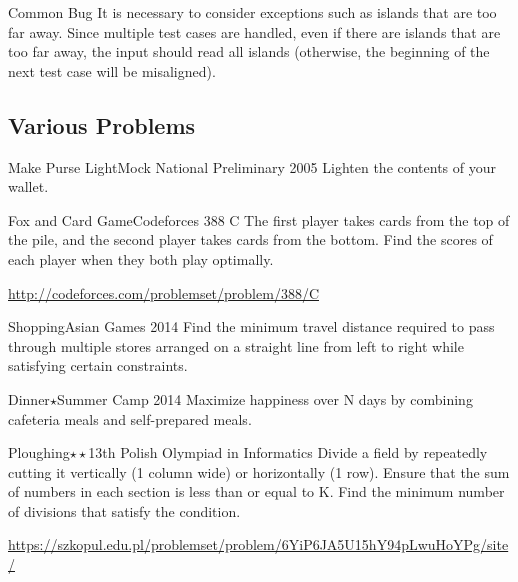 \begin{debugbox}{Common Bug}
It is necessary to consider exceptions such as islands that are too far away. Since multiple test cases are handled, even if there are islands that are too far away, the input should read all islands (otherwise, the beginning of the next test case will be misaligned).
\end{debugbox}
\subsection{Various Problems}

\begin{pbox}{Make Purse Light}{Mock National Preliminary 2005}
Lighten the contents of your wallet.
  
\end{pbox}

\begin{pbox}{Fox and Card Game}{Codeforces 388 C}
The first player takes cards from the top of the pile, and the second player takes cards from the bottom. Find the scores of each player when they both play optimally.

\url{http://codeforces.com/problemset/problem/388/C}
\end{pbox}

\begin{pbox}{Shopping}{Asian Games 2014}
Find the minimum travel distance required to pass through multiple stores arranged on a straight line from left to right while satisfying certain constraints.
  
\end{pbox}

\begin{pbox}{Dinner$\star$}{Summer Camp 2014}
Maximize happiness over N days by combining cafeteria meals and self-prepared meals.
  
\end{pbox}


\begin{pbox}{Ploughing$\star\star$}{13th Polish Olympiad in Informatics}
Divide a field by repeatedly cutting it vertically (1 column wide) or horizontally (1 row).
Ensure that the sum of numbers in each section is less than or equal to K. Find the minimum number of divisions that satisfy the condition.

\url{https://szkopul.edu.pl/problemset/problem/6YiP6JA5U15hY94pLwuHoYPg/site/}
\end{pbox}

